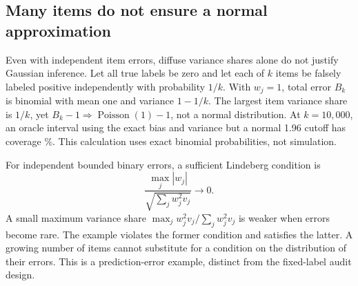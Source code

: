 \subsection{Many items do not ensure a normal approximation}
Even with independent item errors, diffuse variance shares alone do not
justify Gaussian inference. Let all true labels be zero and let each of $k$
items be falsely labeled positive independently with probability $1/k$.
With $w_j=1$, total error $B_k$ is binomial with mean one and variance $1-1/k$.
The largest item variance share is $1/k$, yet
$B_k-1\Rightarrow\operatorname{Poisson}(1)-1$, not a normal distribution.
At $k=10{,}000$, an oracle interval using the exact bias and variance but a
normal 1.96 cutoff has coverage \RareNormalCoverage{}\%. This calculation
uses exact binomial probabilities, not simulation.

For independent bounded binary errors, a sufficient Lindeberg condition is
\[\frac{\max_j|w_j|}{\sqrt{\sum_jw_j^2v_j}}\to0.\]
A small maximum variance share
$\max_j w_j^2v_j/\sum_jw_j^2v_j$ is weaker when errors become rare. The example
violates the former condition and satisfies the latter. A growing number of
items cannot substitute for a condition on the distribution of their errors.
This is a prediction-error example, distinct from the fixed-label audit design.
